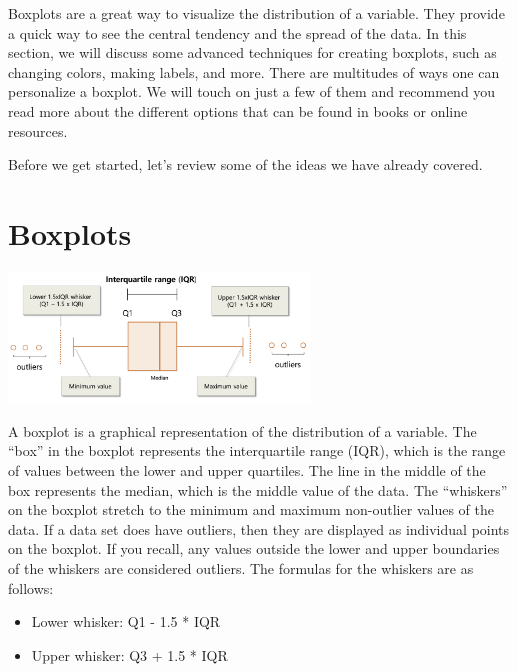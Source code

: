 \documentclass[
  letterpaper,
  DIV=11,
  numbers=noendperiod]{scrreprt}
\providecommand{\tightlist}{%
  \setlength{\itemsep}{0pt}\setlength{\parskip}{0pt}}\usepackage{longtable,booktabs,array}
\begin{document}

Boxplots are a great way to visualize the distribution of a variable.
They provide a quick way to see the central tendency and the spread of
the data. In this section, we will discuss some advanced techniques for
creating boxplots, such as changing colors, making labels, and more.
There are multitudes of ways one can personalize a boxplot. We will
touch on just a few of them and recommend you read more about the
different options that can be found in books or online resources.

Before we get started, let's review some of the ideas we have already
covered.

\section*{Boxplots}\label{boxplots}


\includegraphics[width=0.6\textwidth,height=\textheight]{./images/ABT_1.jpg}

A boxplot is a graphical representation of the distribution of a
variable. The ``box'' in the boxplot represents the interquartile range
(IQR), which is the range of values between the lower and upper
quartiles. The line in the middle of the box represents the median,
which is the middle value of the data. The ``whiskers'' on the boxplot
stretch to the minimum and maximum non-outlier values of the data. If a
data set does have outliers, then they are displayed as individual
points on the boxplot. If you recall, any values outside the lower and
upper boundaries of the whiskers are considered outliers. The formulas
for the whiskers are as follows:

\begin{itemize}
\tightlist
\item
  Lower whisker: Q1 - 1.5 * IQR
\item
  Upper whisker: Q3 + 1.5 * IQR
\end{itemize}
\end{document}
